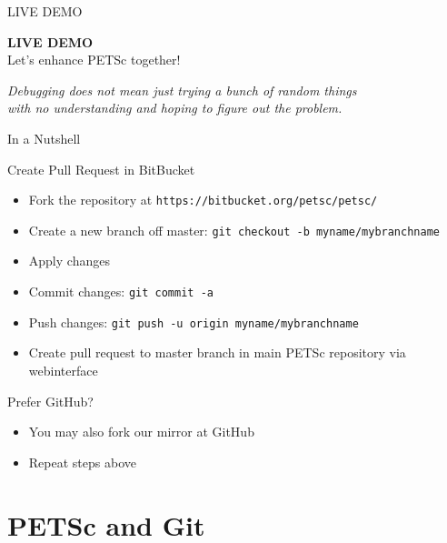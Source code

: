 


\begin{frame}{LIVE DEMO}
  \vspace*{2cm}
   \begin{center} \Large \textbf{LIVE DEMO} \\ \normalsize Let's enhance PETSc together!\end{center}
  \begin{flushright} \vspace*{3cm}
   \begin{flushright}
   \textit{Debugging does not mean just trying a bunch of random things \\
           with no understanding and hoping to figure out the problem.}
  \end{flushright}
  \end{flushright}
\end{frame}


\begin{frame}[fragile]{In a Nutshell}

 \begin{block}{Create Pull Request in BitBucket}
  \begin{itemize}
   \item Fork the repository at \verb|https://bitbucket.org/petsc/petsc/|
   \item Create a new branch off master: \verb|git checkout -b myname/mybranchname|
   \item Apply changes
   \item Commit changes: \verb|git commit -a|
   \item Push changes: \verb|git push -u origin myname/mybranchname|
   \item Create pull request to master branch in main PETSc repository via webinterface
  \end{itemize}
 \end{block}
 
 \begin{block}{Prefer GitHub?}
  \begin{itemize}
   \item You may also fork our mirror at GitHub
   \item Repeat steps above
  \end{itemize}
 \end{block}
 
\end{frame}



%
%
\section{PETSc and Git}

